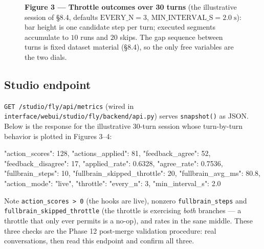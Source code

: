 \documentclass[11pt]{article}
\begin{document}
\begin{figure}[htbp]
\centering
{}
\caption*{\textbf{Figure 3 — Throttle outcomes over 30 turns} (the illustrative session of §8.4, defaults \(\mathrm{EVERY\_N} = 3\), \(\mathrm{MIN\_INTERVAL\_S} = 2.0\;\mathrm{s}\)): bar height is one candidate step per turn; executed segments accumulate to \(10\) runs and \(20\) skips. The gap sequence between turns is fixed dataset material (§8.4), so the only free variables are the two dials.}
\end{figure}

\subsection{Studio endpoint}

\texttt{GET /studio/fly/api/metrics} (wired in \texttt{interface/webui/studio/fly/backend/api.py}) serves \texttt{snapshot()} as JSON. Below is the response for the illustrative 30-turn session whose turn-by-turn behavior is plotted in Figures 3–4:

\begin{CodeBlock}
{
  "action_scores": 128,
  "actions_applied": 81,
  "feedback_agree": 52,
  "feedback_disagree": 17,
  "applied_rate": 0.6328,
  "agree_rate": 0.7536,
  "fullbrain_steps": 10,
  "fullbrain_skipped_throttle": 20,
  "fullbrain_avg_ms": 80.8,
  "action_mode": "live",
  "throttle": {"every_n": 3, "min_interval_s": 2.0}
}
\end{CodeBlock}

Note \texttt{action\_scores > 0} (the hooks are live), nonzero \texttt{fullbrain\_steps} and \texttt{fullbrain\_skipped\_throttle} (the throttle is exercising \emph{both} branches — a throttle that only ever permits is a no-op), and rates in the sane middle. These three checks are the Phase 12 post-merge validation procedure: real conversations, then read this endpoint and confirm all three.
\end{document}
